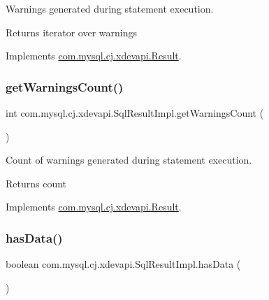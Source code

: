 Warnings generated during statement execution.

\begin{DoxyReturn}{Returns}
iterator over warnings 
\end{DoxyReturn}


Implements \mbox{\hyperlink{interfacecom_1_1mysql_1_1cj_1_1xdevapi_1_1_result_a7bd12aba36fc02a31c8fd546fe731e98}{com.\+mysql.\+cj.\+xdevapi.\+Result}}.

\mbox{\label{classcom_1_1mysql_1_1cj_1_1xdevapi_1_1_sql_result_impl_aec69633fd00fa0b998014ea8f94cc797}} 
\subsubsection{\texorpdfstring{get\+Warnings\+Count()}{getWarningsCount()}}
{\footnotesize\ttfamily int com.\+mysql.\+cj.\+xdevapi.\+Sql\+Result\+Impl.\+get\+Warnings\+Count (\begin{DoxyParamCaption}{ }\end{DoxyParamCaption})}

Count of warnings generated during statement execution.

\begin{DoxyReturn}{Returns}
count 
\end{DoxyReturn}


Implements \mbox{\hyperlink{interfacecom_1_1mysql_1_1cj_1_1xdevapi_1_1_result_addd5c82af4ab35e702d7f2961119ecc6}{com.\+mysql.\+cj.\+xdevapi.\+Result}}.

\mbox{\label{classcom_1_1mysql_1_1cj_1_1xdevapi_1_1_sql_result_impl_afc10544f4b662a846d92d2889cd20335}} 
\subsubsection{\texorpdfstring{has\+Data()}{hasData()}}
{\footnotesize\ttfamily boolean com.\+mysql.\+cj.\+xdevapi.\+Sql\+Result\+Impl.\+has\+Data (\begin{DoxyParamCaption}{ }\end{DoxyParamCaption})}

